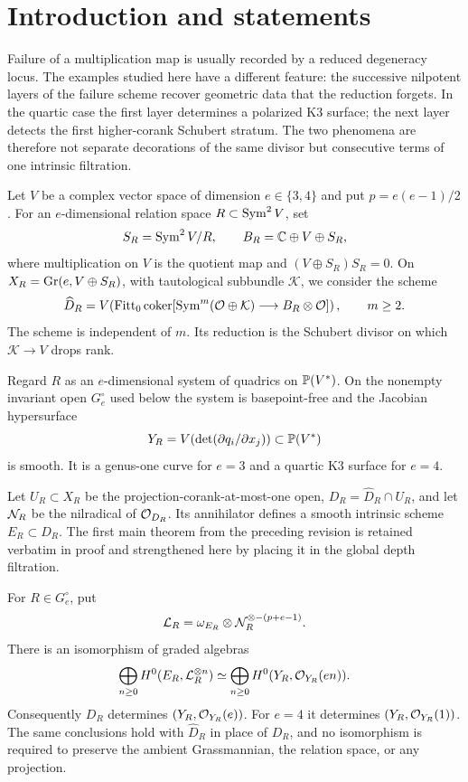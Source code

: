 \section{Introduction and statements}

Failure of a multiplication map is usually recorded by a reduced
degeneracy locus.  The examples studied here have a different feature:
the successive nilpotent layers of the failure scheme recover
geometric data that the reduction forgets.  In the quartic case the
first layer determines a polarized K3 surface; the next layer detects
the first higher-corank Schubert stratum.  The two phenomena are
therefore not separate decorations of the same divisor but consecutive
terms of one intrinsic filtration.

Let $V$ be a complex vector space of dimension $e\in\{3,4\}$ and put
$p=e(e-1)/2$.  For an $e$-dimensional relation space
$R\subset\operatorname{Sym}^2V$, set
\[
 S_R=\operatorname{Sym}^2V/R,\qquad B_R=\mathbb C\oplus V\oplus S_R,
\]
where multiplication on $V$ is the quotient map and
$(V\oplus S_R)S_R=0$.  On
$X_R=\operatorname{Gr}(e,V\oplus S_R)$, with tautological subbundle $\mathcal K$,
we consider the scheme
\[
 \widehat D_R=
 V\!\left(\operatorname{Fitt}_0\operatorname{coker}[
 \operatorname{Sym}^m(\mathcal O\oplus\mathcal K)\longrightarrow B_R\otimes\mathcal O]\right),
 \qquad m\ge2.
\]
The scheme is independent of $m$.  Its reduction is the Schubert
divisor on which $\mathcal K\to V$ drops rank.

Regard $R$ as an $e$-dimensional system of quadrics on $\mathbb P(V^*)$.
On the nonempty invariant open $G_e^\circ$ used below the system is
basepoint-free and the Jacobian hypersurface
\begin{equation}\label{eq:Y-intro}
 Y_R=V\!\left(\det(\partial q_i/\partial x_j)\right)
 \subset\mathbb P(V^*)
\end{equation}
is smooth.  It is a genus-one curve for $e=3$ and a quartic K3
surface for $e=4$.

Let $U_R\subset X_R$ be the projection-corank-at-most-one open,
$D_R=\widehat D_R\cap U_R$, and let $\mathcal N_R$ be the nilradical of
$\mathcal O_{D_R}$.  Its annihilator defines a smooth intrinsic scheme
$E_R\subset D_R$.  The first main theorem from the preceding revision
is retained verbatim in proof and strengthened here by placing it in
the global depth filtration.

\begin{theorem}\label{thm:main-reconstruction}
For $R\in G_e^\circ$, put
\[
 \mathcal L_R=\omega_{E_R}\otimes\mathcal N_R^{\otimes-(p+e-1)}.
\]
There is an isomorphism of graded algebras
\[
 \bigoplus_{n\ge0}H^0(E_R,\mathcal L_R^{\otimes n})
 \simeq
 \bigoplus_{n\ge0}H^0(Y_R,\mathcal O_{Y_R}(en)).
\]
Consequently $D_R$ determines $(Y_R,\mathcal O_{Y_R}(e))$.  For $e=4$
it determines $(Y_R,\mathcal O_{Y_R}(1))$.  The same conclusions hold with
$\widehat D_R$ in place of $D_R$, and no isomorphism is required to
preserve the ambient Grassmannian, the relation space, or any
projection.
\end{theorem}

